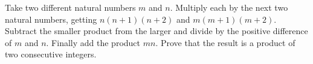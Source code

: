 Take two different natural numbers $m$ and $n$. Multiply each by the next two natural numbers, getting $n(n+1)(n+2)$ and $m(m+1)(m+2)$. Subtract the smaller product from the larger and divide by the positive difference of $m$ and $n$. Finally add the product $mn$. Prove that the result is a product of two consecutive integers.
